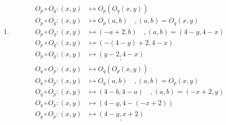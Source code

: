 \documentclass[12pt]{article}
\begin{document}
\begin{enumerate}
\begin{enumerate}
      \item
      \begin{align*}
        O_p \circ O_q: (x,y) &\mapsto O_p(O_q(x,y)) \\
        O_p \circ O_q: (x,y) &\mapsto O_p(a,b) \quad , (a,b) = O_q(x,y) \\
        O_p \circ O_q: (x,y) &\mapsto (-a+2, b) \quad , (a,b) = (4-y, 4-x) \\
        O_p \circ O_q: (x,y) &\mapsto (-(4-y)+2, 4-x) \quad \\
        O_p \circ O_q: (x,y) &\mapsto \underline{\underline{(y-2, 4-x)}}
      \end{align*}
      \begin{align*}
        O_q \circ O_p: (x,y) &\mapsto O_q(O_p(x,y)) \\
        O_q \circ O_p: (x,y) &\mapsto O_q(a,b) \quad , (a,b) = O_p(x,y) \\
        O_q \circ O_p: (x,y) &\mapsto (4-b, 4-a) \quad , (a,b) = (-x+2, y) \\
        O_q \circ O_p: (x,y) &\mapsto (4-y, 4-(-x+2)) \\
        O_q \circ O_p: (x,y) &\mapsto \underline{\underline{(4-y, x+2)}}
      \end{align*}
    \end{enumerate}
\end{enumerate}
\end{document}
